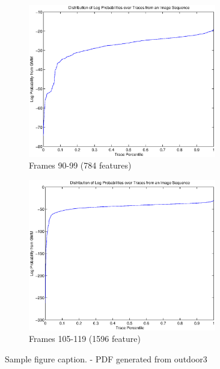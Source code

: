 \begin{figure}[h]
	\begin{subfigure}[b]{0.5\textwidth}
		\centering
		\includegraphics[width=0.9\textwidth]{figs/logpdfs-frame90.eps}
		\caption{Frames 90-99 (784 features)}
		\label{fig:logpdfs:90}
	\end{subfigure}%
	\begin{subfigure}[b]{0.5\textwidth}
		\centering
		\includegraphics[width=0.9\textwidth]{figs/logpdfs.eps}
		\caption{Frames 105-119 (1596 feature) }
		\label{fig:logpdfs:105}
	\end{subfigure}%

	\caption{Sample figure caption. - PDF generated from outdoor3}
	\label{fig:logpdfs}
\end{figure}

